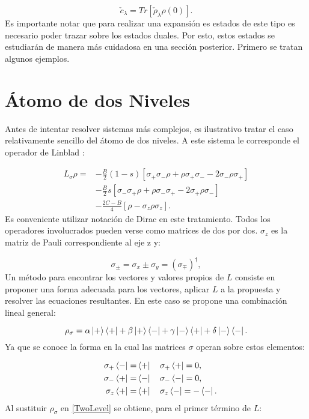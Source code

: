 \documentclass[a4paper,10pt]{report}
\begin{document}
\begin{equation}
\check{c}_\lambda = Tr[\check{\rho}_\lambda \rho(0)].
\end{equation} Es importante notar que para realizar una expansión es estados de este tipo es necesario poder trazar sobre los estados duales. Por esto, estos estados se estudiarán de manera más cuidadosa en una sección posterior. Primero se tratan algunos ejemplos.

\section{Átomo de dos Niveles}

Antes de intentar resolver sistemas más complejos, es ilustrativo tratar el caso relativamente sencillo del átomo de dos niveles. A este sistema le corresponde el operador de Linblad \cite{EnglertDB}:

\begin{align}\label{TwoLevel}
 L_{\sigma}\rho = 
 &-\frac{B}{2}(1-s)[\sigma_+\sigma_-\rho + \rho\sigma_+\sigma_--2\sigma_-\rho\sigma_+ ]\nonumber\\
 &-\frac{B}{2}s[\sigma_-\sigma_+\rho + \rho\sigma_-\sigma_+-2\sigma_+\rho\sigma_- ]\nonumber\\
 &-\frac{2C-B}{4}[\rho - \sigma_z\rho\sigma_z].
\end{align} Es conveniente utilizar notación de Dirac en este tratamiento. Todos los operadores involucrados pueden verse como matrices de dos por dos. $\sigma_z$ es la matriz de Pauli correspondiente al eje z y:

\begin{equation}
\sigma_{\pm} = \sigma_x \pm \sigma_y = (\sigma_{\mp}) ^\dagger,
\end{equation} Un método \cite{BarnettSD} para encontrar los vectores y valores propios de $L$ consiste en proponer una forma adecuada para los vectores, aplicar $L$ a la propuesta y resolver las ecuaciones resultantes. En este caso se propone una combinación lineal general:

\begin{equation}
\rho_\sigma = \alpha\Ket{+}\Bra{+}+\beta\Ket{+}\Bra{-}+\gamma\Ket{-}\Bra{+}+\delta\Ket{-}\Bra{-}.
\end{equation} Ya que se conoce la forma en la cual las matrices $\sigma$ operan sobre estos elementos:

\begin{align*}
&&\sigma_{+}\Bra{-} =& \Bra{+} \quad \sigma_{+}\Bra{+} = 0, \\
&&\sigma_{-}\Bra{+} =& \Bra{-} \quad \sigma_{-}\Bra{-} = 0, \\
&&\sigma_{z}\Bra{+} =& \Bra{+} \quad \sigma_{z}\Bra{-} = -\Bra{-}.
\end{align*} Al sustituir $\rho_{\sigma}$ en \eqref{TwoLevel} se obtiene, para el primer término de $L$:
\end{document}
